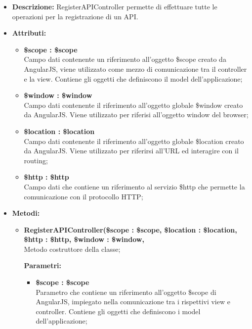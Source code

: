 \begin{itemize}
	\item \textbf{Descrizione:} RegisterAPIController permette di effettuare tutte le operazioni per la registrazione di un API.
	\item \textbf{Attributi:}
	\begin{itemize}
		
		\item \textbf{\$scope : \$scope}\\
		Campo dati contenente un riferimento all'oggetto \$scope creato da AngularJS, viene utilizzato come mezzo di comunicazione tra il controller e la view. Contiene gli oggetti che definiscono il model dell'applicazione;
		
		\item \textbf{\$window : \$window}\\
		Campo dati contenente il riferimento all'oggetto globale \$window creato da AngularJS. Viene utilizzato per riferisi all'oggetto window del browser;
		
		\item \textbf{\$location : \$location }\\
		Campo dati contenente il riferimento all'oggetto globale \$location creato da AngularJS. Viene utilizzato per riferirsi all'URL ed interagire con il routing;
		
		\item \textbf{\$http : \$http }\\
		Campo dati che contiene un riferimento al servizio \$http che permette la comunicazione con il protocollo HTTP;
		
		
	\end{itemize}
	\item \textbf{Metodi:}
	\begin{itemize}
		
		\item \textbf{RegisterAPIController(\$scope : \$scope, \$location : \$location, \$http : \$http, \$window : \$window,}\\
		Metodo costruttore della classe;
		\begin{description}
			\item[\textbf{Parametri:}]
		\end{description}
		\begin{itemize}
			\item \textbf{\$scope : \$scope}\\
			Parametro che contiene un riferimento all'oggetto \$scope di AngularJS, impiegato nella comunicazione tra i rispettivi view e controller. Contiene gli oggetti che definiscono i model dell'applicazione;
			

\end{itemize}
\end{itemize}
\end{itemize}
